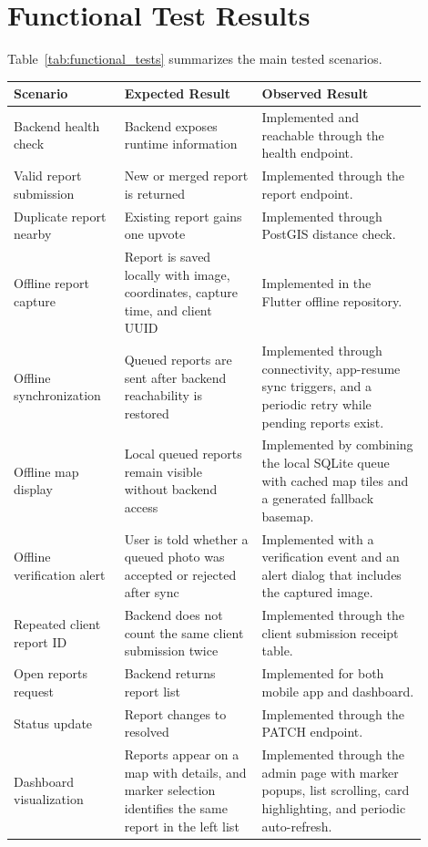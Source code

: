 \section{Functional Test Results}

Table~\ref{tab:functional_tests} summarizes the main tested scenarios.

\begin{table}[htbp]
\centering
\begin{tabular}{>{\raggedright\arraybackslash}p{0.24\linewidth} >{\raggedright\arraybackslash}p{0.30\linewidth} >{\raggedright\arraybackslash}p{0.36\linewidth}}
\toprule
\textbf{Scenario} & \textbf{Expected Result} & \textbf{Observed Result} \\
\midrule
Backend health check & Backend exposes runtime information & Implemented and reachable through the health endpoint. \\
Valid report submission & New or merged report is returned & Implemented through the report endpoint. \\
Duplicate report nearby & Existing report gains one upvote & Implemented through PostGIS distance check. \\
Offline report capture & Report is saved locally with image, coordinates, capture time, and client UUID & Implemented in the Flutter offline repository. \\
Offline synchronization & Queued reports are sent after backend reachability is restored & Implemented through connectivity, app-resume sync triggers, and a periodic retry while pending reports exist. \\
Offline map display & Local queued reports remain visible without backend access & Implemented by combining the local SQLite queue with cached map tiles and a generated fallback basemap. \\
Offline verification alert & User is told whether a queued photo was accepted or rejected after sync & Implemented with a verification event and an alert dialog that includes the captured image. \\
Repeated client report ID & Backend does not count the same client submission twice & Implemented through the client submission receipt table. \\
Open reports request & Backend returns report list & Implemented for both mobile app and dashboard. \\
Status update & Report changes to resolved & Implemented through the PATCH endpoint. \\
Dashboard visualization & Reports appear on a map with details, and marker selection identifies the same report in the left list & Implemented through the admin page with marker popups, list scrolling, card highlighting, and periodic auto-refresh. \\

\end{tabular}
\end{table}
